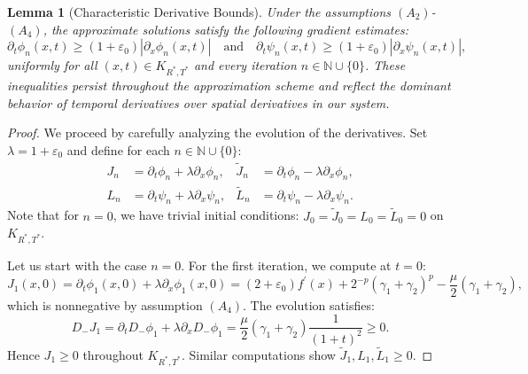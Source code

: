 \documentclass[
  sn-mathphys-num,
  colorlinks,
  linkcolor=darkmagenta,
  citecolor=rufous,
  urlcolor=zaffre,
  hypertexnames=false
]{sn-jnl}
\numberwithin{equation}{section}
\newtheorem{lemma}[theorem]{Lemma}%
\begin{document}
\begin{lemma}[Characteristic Derivative Bounds]\label{em}
Under the assumptions $(A_2)$-$(A_4)$, the approximate solutions satisfy the following gradient estimates:
$$
\partial_t \phi_n(x,t) \geq (1+\varepsilon_0)|\partial_x \phi_n(x,t)| \quad \text{and} \quad \partial_t \psi_n(x,t) \geq (1+\varepsilon_0)|\partial_x \psi_n(x,t)|,
$$
uniformly for all $(x,t) \in K_{R^*,T^*}$ and every iteration $n \in \mathbb{N} \cup \{0\}$. These inequalities persist throughout the approximation scheme and reflect the dominant behavior of temporal derivatives over spatial derivatives in our system.
\end{lemma}
\begin{proof}
We proceed by carefully analyzing the evolution of the derivatives. Set $\lambda = 1 + \varepsilon_0$ and define for each $n \in \mathbb{N} \cup \{0\}$:
$$
\begin{aligned}
J_n &= \partial_t \phi_n + \lambda \partial_x \phi_n, & \tilde{J}_n &= \partial_t \phi_n - \lambda \partial_x \phi_n, \\
L_n &= \partial_t \psi_n + \lambda \partial_x \psi_n, & \tilde{L}_n &= \partial_t \psi_n - \lambda \partial_x \psi_n.
\end{aligned}
$$
Note that for $n=0$, we have trivial initial conditions: $J_0 = \tilde{J}_0 = L_0 = \tilde{L}_0 = 0$ on $K_{R^*,T^*}$.

Let us start with the case $n=0$. For the first iteration, we compute at $t=0$:
$$
J_1(x,0) = \partial_t \phi_1(x,0) + \lambda \partial_x \phi_1(x,0) = (2+\varepsilon_0)f^\prime(x) + 2^{-p}(\gamma_1+\gamma_2)^p - \frac{\mu}{2}(\gamma_1+\gamma_2),
$$
which is nonnegative by assumption $(A_4)$. The evolution satisfies:
$$
D_- J_1 = \partial_t D_- \phi_1 + \lambda \partial_x D_- \phi_1 = \frac{\mu}{2}(\gamma_1+\gamma_2)\frac{1}{(1+t)^2} \geq 0.
$$
Hence $J_1 \geq 0$ throughout $K_{R^*,T^*}$. Similar computations show $\tilde{J}_1, L_1, \tilde{L}_1 \geq 0$.


\end{proof}
\end{document}
